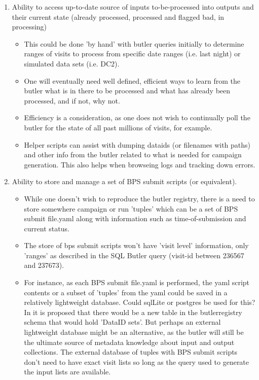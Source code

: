 \documentclass[DM,authoryear,toc]{lsstdoc}
\begin{document}
	\begin{enumerate}

	\item Ability to access up-to-date source of inputs to-be-processed
		into outputs and their current state 
		(already processed, processed and flagged bad, 
		in processing)

	\begin{itemize}
	
	\item This could be done 'by hand' with butler queries initially
	to determine ranges of visits to process from specific date
	ranges (i.e. last night) or simulated data sets (i.e. DC2).

	\item One will eventually need well defined, efficient ways
	to learn from the butler what is in there to be processed and
	what has already been processed, and if not, why not.
	
	\item Efficiency is a consideration, as one does not wish to
	continually poll the butler for the state of all past millions of
	visits, for example.

	\item Helper scripts can assist with dumping dataids (or filenames
	with paths) and other info from the butler related to
	what is needed for campaign generation. This also helps when
	browseing logs and tracking down errors.

	\end{itemize}

	\item Ability to store and manage a set of BPS submit scripts 
	(or equivalent).

	\begin{itemize}

	\item While one doesn't wish to reproduce the butler registry, there
	is a need to store somewhere campaign or run 'tuples' which
	can be a set of BPS submit file.yaml along with information
	such as time-of-submission and current status.

	\item The store of bps submit scripts won't have 'visit level'
	information, only 'ranges' as described in the SQL Butler 
	query (visit-id between 236567 and 237673).

	\item For instance, as each BPS submit file.yaml is performed, the yaml
	script contents or a subset of 'tuples' from the yaml
	could be saved in a relatively lightweight database.  Could
	sqlLite or postgres be used for this?
	In \cite{DMTN-181} it is proposed that there would be a new table
	in the butlerregistry schema that would hold 'DataID sets'.  But
	perhaps an external lightweight database might be an alternative,
	as the butler will still be the ultimate source of metadata
	knowledge about input and output collections.  The external
	database of tuples with BPS submit scripts don't need to
	have exact visit lists so long as the query used to generate
	the input lists are available.


\end{itemize}
\end{enumerate}
\end{document}

